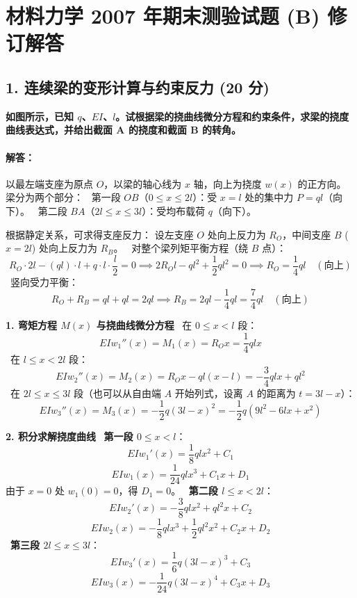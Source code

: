 \documentclass[11pt,a4paper]{ctexrep}
\begin{document}
\chapter{材料力学 2007 年期末测验试题 (B) 修订解答}
{



\section*{1. 连续梁的变形计算与约束反力 (20 分)}

\textbf{如图所示，已知 $q$、$EI$、$l$。试根据梁的挠曲线微分方程和约束条件，求梁的挠度曲线表达式，并给出截面 A 的挠度和截面 B 的转角。}

\subsubsection*{解答：}

以最左端支座为原点 $O$，以梁的轴心线为 $x$ 轴，向上为挠度 $w(x)$ 的正方向。梁分为两个部分：
\noindent\textbullet\ 第一段 $OB$（$0 \le x \le 2l$）：受 $x=l$ 处的集中力 $P = ql$（向下）。
\noindent\textbullet\ 第二段 $BA$（$2l \le x \le 3l$）：受均布载荷 $q$（向下）。

根据静定关系，可求得支座反力：
设左支座 $O$ 处向上反力为 $R_O$，中间支座 $B$ ($x=2l$) 处向上反力为 $R_B$。
\noindent\textbullet\ 对整个梁列矩平衡方程（绕 $B$ 点）：
  \[
  R_O \cdot 2l - (ql) \cdot l + q \cdot l \cdot \frac{l}{2} = 0 \implies 2 R_O l - q l^2 + \frac{1}{2} q l^2 = 0 \implies R_O = \frac{1}{4} ql \quad (\text{向上})
  \]
\noindent\textbullet\ 竖向受力平衡：
  \[
  R_O + R_B = ql + ql = 2ql \implies R_B = 2ql - \frac{1}{4}ql = \frac{7}{4} ql \quad (\text{向上})
  \]

\textbf{1. 弯矩方程 $M(x)$ 与挠曲线微分方程}
\noindent\textbullet\ 在 $0 \le x < l$ 段：
  \[
  EI w_1''(x) = M_1(x) = R_O x = \frac{1}{4} ql x
  \]
\noindent\textbullet\ 在 $l \le x < 2l$ 段：
  \[
  EI w_2''(x) = M_2(x) = R_O x - ql(x-l) = -\frac{3}{4} ql x + ql^2
  \]
\noindent\textbullet\ 在 $2l \le x \le 3l$ 段（也可以从自由端 $A$ 开始列式，设离 $A$ 的距离为 $t = 3l - x$）：
  \[
  EI w_3''(x) = M_3(x) = -\frac{1}{2} q (3l-x)^2 = -\frac{1}{2} q (9l^2 - 6lx + x^2)
  \]

\textbf{2. 积分求解挠度曲线}
\noindent\textbullet\ \textbf{第一段 $0 \le x < l$}：
  \[
  EI w_1'(x) = \frac{1}{8} ql x^2 + C_1
  \]
  \[
  EI w_1(x) = \frac{1}{24} ql x^3 + C_1 x + D_1
  \]
  由于 $x=0$ 处 $w_1(0) = 0$，得 $D_1 = 0$。
\noindent\textbullet\ \textbf{第二段 $l \le x < 2l$}：
  \[
  EI w_2'(x) = -\frac{3}{8} ql x^2 + ql^2 x + C_2
  \]
  \[
  EI w_2(x) = -\frac{1}{8} ql x^3 + \frac{1}{2} ql^2 x^2 + C_2 x + D_2
  \]
\noindent\textbullet\ \textbf{第三段 $2l \le x \le 3l$}：
  \[
  EI w_3'(x) = \frac{1}{6} q (3l-x)^3 + C_3
  \]
  \[
  EI w_3(x) = -\frac{1}{24} q (3l-x)^4 + C_3 x + D_3
  \]

}
\end{document}
